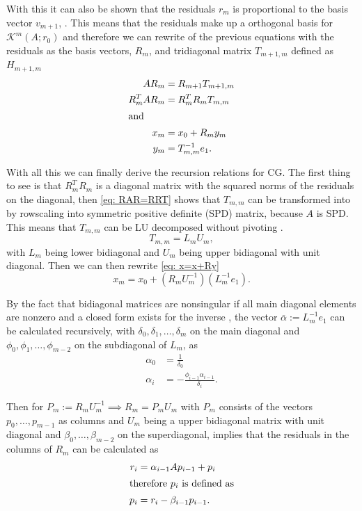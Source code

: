With this it can also be shown that the residuals \(r_m\) is proportional to the basis vector \(v_{m+1}\), \cite{Saad2003}. This means that the residuals make up a orthogonal basis for \(\mathcal{K}^m(A;r_0)\) and therefore we can rewrite of the previous equations with the residuals as the basis vectors, \(R_m\), and tridiagonal matrix \(T_{m+1,m}\) defined as \(H_{m+1,m}\)
\begin{align}
    AR_{m}&=R_{m+1}T_{m+1,m}\\
    R_{m}^TAR_{m}&=R_{m}^TR_{m}T_{m,m}\label{eq: RAR=RRT}\\
\intertext{and}
    x_m&=x_0+R_m y_m\label{eq: x=x+Ry}\\
    y_m&=T_{m,m}^{-1}e_1.
\end{align}

With all this we can finally derive the recursion relations for CG. The first thing to see is that \(R_{m}^TR_{m}\) is a diagonal matrix with the squared norms of the residuals on the diagonal, then \eqref{eq: RAR=RRT} shows that \(T_{m,m}\) can be transformed into by rowscaling into symmetric positive definite  (SPD) matrix, because \(A\) is SPD. This means that \(T_{m,m}\) can be LU decomposed without pivoting \cite{Vorst03}.
\begin{equation*}
    T_{m,m}=L_m U_m,
\end{equation*}
with \(L_m\) being lower bidiagonal and \(U_m\) being upper bidiagonal with unit diagonal. Then we can then rewrite \eqref{eq: x=x+Ry}
\begin{equation}\label{eq: x=x+RULe}
    x_m=x_0+(R_mU_m^{-1})(L_m^{-1}e_1).
\end{equation}

By the fact that bidiagonal matrices are nonsingular if all main diagonal elements are nonzero and a closed form exists for the inverse \cite{higham23}, the vector \(\bar{\alpha}:=L_m^{-1}e_1\) can be calculated recursively, with \(\delta_0,\delta_1,\ldots,\delta_m\) on the main diagonal and \(\phi_0,\phi_1,\ldots,\phi_{m-2}\) on the subdiagonal of \(L_m\), as
\begin{align*}
    \alpha_0&=\frac{1}{\delta_0}\\
    \alpha_i&=-\frac{\phi_{i-1}\alpha_{i-1}}{\delta_i}.
\end{align*}

Then for \(P_m := R_m U_m^{-1}\implies R_m =P_m U_m \) with \(P_m\) consists of the vectors \(p_0,\ldots,p_{m-1}\) as columns and \(U_m\) being a upper bidiagonal matrix with unit diagonal and \(\beta_0,\ldots,\beta_{m-2}\) on the superdiagonal, implies that the residuals in the columns of \(R_m\) can be calculated as
\begin{align}
    r_{i}&=\alpha_{i-1}Ap_{i-1}+p_{i}\label{eq: r=bp+p}\\
\intertext{therefore \(p_i\) is defined as}
    p_i&=r_i-\beta_{i-1}p_{i-1}.\label{eq: p=r-bp}
\end{align}

